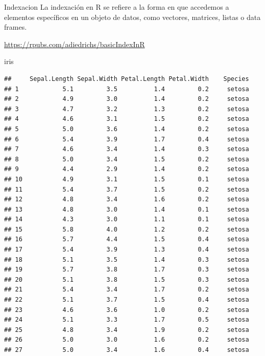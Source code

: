 \documentclass[
  ignorenonframetext,
]{beamer}
\newenvironment{Shaded}{\begin{snugshade}}{\end{snugshade}}
\newcommand{\NormalTok}[1]{#1}
\begin{document}
\begin{frame}[fragile]{Indexacion}
\protect\hypertarget{indexacion}{}
La indexación en R se refiere a la forma en que accedemos a elementos
específicos en un objeto de datos, como vectores, matrices, listas o
data frames.

\url{https://rpubs.com/adiedrichs/basicIndexInR}

\begin{Shaded}
\begin{Highlighting}[]
\NormalTok{iris}
\end{Highlighting}
\end{Shaded}

\begin{verbatim}
##     Sepal.Length Sepal.Width Petal.Length Petal.Width    Species
## 1            5.1         3.5          1.4         0.2     setosa
## 2            4.9         3.0          1.4         0.2     setosa
## 3            4.7         3.2          1.3         0.2     setosa
## 4            4.6         3.1          1.5         0.2     setosa
## 5            5.0         3.6          1.4         0.2     setosa
## 6            5.4         3.9          1.7         0.4     setosa
## 7            4.6         3.4          1.4         0.3     setosa
## 8            5.0         3.4          1.5         0.2     setosa
## 9            4.4         2.9          1.4         0.2     setosa
## 10           4.9         3.1          1.5         0.1     setosa
## 11           5.4         3.7          1.5         0.2     setosa
## 12           4.8         3.4          1.6         0.2     setosa
## 13           4.8         3.0          1.4         0.1     setosa
## 14           4.3         3.0          1.1         0.1     setosa
## 15           5.8         4.0          1.2         0.2     setosa
## 16           5.7         4.4          1.5         0.4     setosa
## 17           5.4         3.9          1.3         0.4     setosa
## 18           5.1         3.5          1.4         0.3     setosa
## 19           5.7         3.8          1.7         0.3     setosa
## 20           5.1         3.8          1.5         0.3     setosa
## 21           5.4         3.4          1.7         0.2     setosa
## 22           5.1         3.7          1.5         0.4     setosa
## 23           4.6         3.6          1.0         0.2     setosa
## 24           5.1         3.3          1.7         0.5     setosa
## 25           4.8         3.4          1.9         0.2     setosa
## 26           5.0         3.0          1.6         0.2     setosa
## 27           5.0         3.4          1.6         0.4     setosa

\end{verbatim}
\end{frame}
\end{document}
